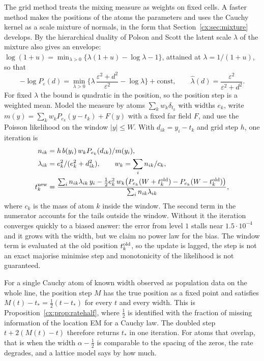 The grid method treats the mixing measure as weights on fixed cells. A faster method makes the positions of the atoms the parameters and uses the Cauchy kernel as a scale mixture of normals, in the form that Section~\ref{cx:sec:mixture} develops. By the hierarchical duality of Polson and Scott \cite{PolsonScott16} the latent scale $\lambda$ of the mixture also gives an envelope: $\log(1+u)=\min_{\lambda>0}\{\lambda(1+u)-\log\lambda-1\}$, attained at $\lambda=1/(1+u)$, so that
\[
-\log P_\varepsilon(d)=\min_{\lambda>0}\Big\{\lambda\,\frac{\varepsilon^2+d^2}{\varepsilon^2}-\log\lambda\Big\}+\text{const},\qquad\hat\lambda(d)=\frac{\varepsilon^2}{\varepsilon^2+d^2}.
\]
For fixed $\lambda$ the bound is quadratic in the position, so the position step is a weighted mean. Model the measure by atoms $\sum_kw_k\delta_{t_k}$ with widths $e_k$, write $m(y)=\sum_kw_kP_{e_k}(y-t_k)+F(y)$ with a fixed far field $F$, and use the Poisson likelihood on the window $|y|\le W$. With $d_{ik}=y_i-t_k$ and grid step $h$, one iteration is
\begin{align*}
n_{ik}&=h\,b(y_i)\,w_kP_{e_k}(d_{ik})/m(y_i),\\
\lambda_{ik}&=e_k^2/(e_k^2+d_{ik}^2),\qquad w_k=\sum_in_{ik}/c_k,\\
t_k^{\rm new}&=\frac{\sum_in_{ik}\lambda_{ik}\,y_i-\frac12 e_k^2\,w_k\big(P_{e_k}(W+t_k^{\rm old})-P_{e_k}(W-t_k^{\rm old})\big)}{\sum_in_{ik}\lambda_{ik}},
\end{align*}
where $c_k$ is the mass of atom $k$ inside the window. The second term in the numerator accounts for the tails outside the window. Without it the iteration converges quickly to a biased answer: the error from level $1$ stalls near $1.5\cdot10^{-4}$ and it grows with the width, but we claim no power law for the bias. The window term is evaluated at the old position $t_k^{\rm old}$, so the update is lagged, the step is not an exact majorise minimise step and monotonicity of the likelihood is not guaranteed.

For a single Cauchy atom of known width observed as population data on the whole line, the position step $M$ has the true position as a fixed point and satisfies $M(t)-t_*=\frac12(t-t_*)$ for every $t$ and every width. This is Proposition~\ref{cx:prop:ratehalf}, where $\frac12$ is identified with the fraction of missing information of the location EM for a Cauchy law. The doubled step $t+2(M(t)-t)$ therefore returns $t_*$ in one iteration. For atoms that overlap, that is when the width $\alpha-\frac12$ is comparable to the spacing of the zeros, the rate degrades, and a lattice model says by how much.

